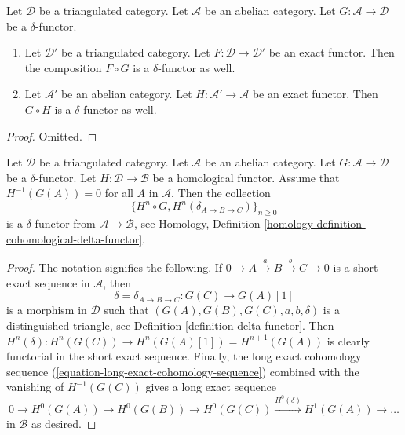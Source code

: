 \begin{lemma}
\label{lemma-exact-compose-delta-functor}
Let $\mathcal{D}$ be a triangulated category.
Let $\mathcal{A}$ be an abelian category.
Let $G : \mathcal{A} \to \mathcal{D}$ be a $\delta$-functor.
\begin{enumerate}
\item Let $\mathcal{D}'$ be a triangulated category.
Let $F : \mathcal{D} \to \mathcal{D}'$ be an exact functor.
Then the composition $F \circ G$ is a $\delta$-functor as well.
\item Let $\mathcal{A}'$ be an abelian category. Let
$H : \mathcal{A}' \to \mathcal{A}$ be an exact functor.
Then $G \circ H$ is a $\delta$-functor as well.
\end{enumerate}
\end{lemma}

\begin{proof}
Omitted.
\end{proof}

\begin{lemma}
\label{lemma-compose-delta-functor-homological}
Let $\mathcal{D}$ be a triangulated category.
Let $\mathcal{A}$ be an abelian category.
Let $G : \mathcal{A} \to \mathcal{D}$ be a $\delta$-functor.
Let $H : \mathcal{D} \to \mathcal{B}$ be a homological functor.
Assume that $H^{-1}(G(A)) = 0$ for all $A$ in $\mathcal{A}$.
Then the collection
$$
\{H^n \circ G, H^n(\delta_{A \to B \to C})\}_{n \geq 0}
$$
is a $\delta$-functor from $\mathcal{A} \to \mathcal{B}$, see
Homology, Definition \ref{homology-definition-cohomological-delta-functor}.
\end{lemma}

\begin{proof}
The notation signifies the following. If
$0 \to A \xrightarrow{a} B \xrightarrow{b} C \to 0$ is
a short exact sequence in $\mathcal{A}$, then
$$
\delta = \delta_{A \to B \to C} : G(C) \to G(A)[1]
$$
is a morphism in $\mathcal{D}$ such that
$(G(A), G(B), G(C), a, b, \delta)$ is
a distinguished triangle, see
Definition \ref{definition-delta-functor}.
Then $H^n(\delta) : H^n(G(C)) \to H^n(G(A)[1]) = H^{n + 1}(G(A))$
is clearly functorial in the short exact sequence.
Finally, the long exact cohomology sequence
(\ref{equation-long-exact-cohomology-sequence})
combined with the vanishing of $H^{-1}(G(C))$
gives a long exact sequence
$$
0 \to H^0(G(A)) \to H^0(G(B)) \to H^0(G(C))
\xrightarrow{H^0(\delta)} H^1(G(A)) \to \ldots
$$
in $\mathcal{B}$ as desired.
\end{proof}

